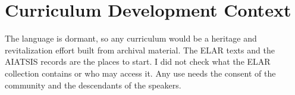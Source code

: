 \documentclass[12pt]{article}
\begin{document}
\section{Curriculum Development Context}
The language is dormant, so any curriculum would be a heritage and revitalization effort built from archival material. The ELAR texts and the AIATSIS records are the places to start. I did not check what the ELAR collection contains or who may access it. Any use needs the consent of the community and the descendants of the speakers.
\end{document}
